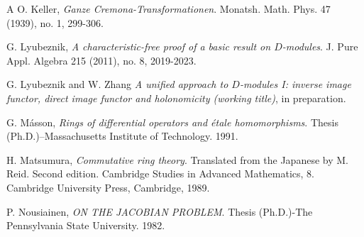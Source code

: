 \documentclass[11pt]{amsart}
\theoremstyle{definition}
\theoremstyle{remark}
\numberwithin{equation}{subsection}
\begin{document}
\begin{thebibliography}{A}
O. Keller, \emph{Ganze Cremona-Transformationen}. Monatsh. Math. Phys. 47 (1939), no. 1, 299-306. 

G. Lyubeznik, \emph{A characteristic-free proof of a basic result on $D$-modules}. J. Pure Appl. Algebra 215 (2011), no. 8, 2019-2023. 

G. Lyubeznik and W. Zhang \emph{A unified approach to {$D$}-modules I: inverse image functor,  direct image functor and holonomicity (working title)}, in preparation.


G. M\'{a}sson, \emph{Rings of differential operators and \'{e}tale homomorphisms}. Thesis (Ph.D.)–Massachusetts Institute of Technology. 1991.

H. Matsumura, \emph{Commutative ring theory}. Translated from the Japanese by M. Reid. Second edition. Cambridge Studies in Advanced Mathematics, 8. Cambridge University Press, Cambridge, 1989. 

P. Nousiainen, \emph{ON THE JACOBIAN PROBLEM}. Thesis (Ph.D.)-The Pennsylvania State University. 1982.  




\end{thebibliography}
\end{document}
